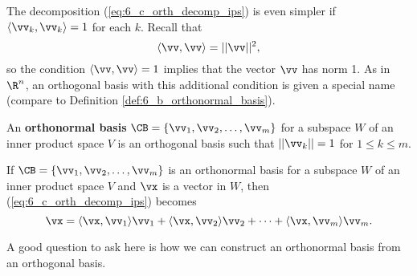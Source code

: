 The decomposition (\ref{eq:6_c_orth_decomp_ips}) is even simpler if $\langle \vv_k, \vv_k \rangle = 1$ for each $k$. Recall that
\[\langle \vv, \vv \rangle = || \vv ||^2,\]
so the condition $\langle \vv, \vv \rangle  = 1$ implies that the vector $\vv$ has norm 1. As in $\R^n$, an orthogonal basis with this additional condition is given a special name (compare to Definition \ref{def:6_b_orthonormal_basis}).

\begin{definition} An \textbf{orthonormal basis} $\CB = \{\vv_1, \vv_2, \ldots, \vv_m\}$ for a subspace $W$ of an inner product space $V$ is an orthogonal basis such that $|| \vv_k || = 1$ for $1\leq k\leq m$.
\end{definition}

If $\CB = \{\vv_1, \vv_2, \ldots, \vv_m\}$ is an orthonormal basis for a subspace $W$ of an inner product space $V$ and $\vx$ is a vector in $W$, then  (\ref{eq:6_c_orth_decomp_ips}) becomes
\begin{equation}
\vx = \langle \vx, \vv_1 \rangle \vv_1 +  \langle \vx, \vv_2 \rangle \vv_2 + \cdots + \langle \vx, \vv_m \rangle \vv_m. \label{eq:6_c_orthnorm_decomp_ips}
\end{equation}

A good question to ask here is how we can construct an orthonormal basis from an orthogonal basis.



